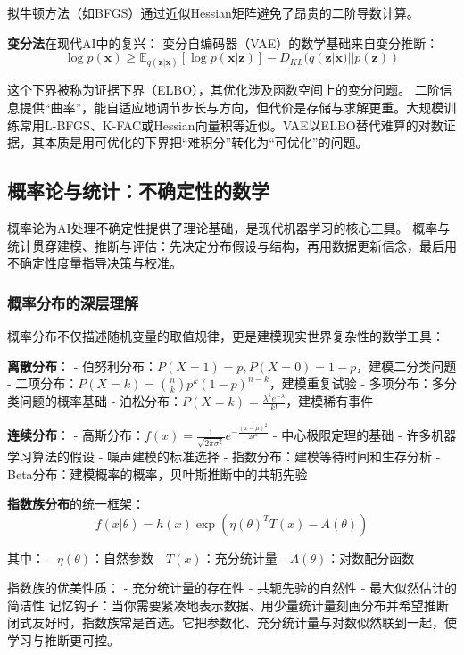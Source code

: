 拟牛顿方法（如BFGS）通过近似Hessian矩阵避免了昂贵的二阶导数计算。

\textbf{变分法}在现代AI中的复兴：
变分自编码器（VAE）的数学基础来自变分推断：
$$\log p(\mathbf{x}) \geq \mathbb{E}_{q(\mathbf{z}|\mathbf{x})}[\log p(\mathbf{x}|\mathbf{z})] - D_{KL}(q(\mathbf{z}|\mathbf{x})||p(\mathbf{z}))$$

这个下界被称为证据下界（ELBO），其优化涉及函数空间上的变分问题。
二阶信息提供“曲率”，能自适应地调节步长与方向，但代价是存储与求解更重。大规模训练常用L-BFGS、K-FAC或Hessian向量积等近似。VAE以ELBO替代难算的对数证据，其本质是用可优化的下界把“难积分”转化为“可优化”的问题。

\subsection{概率论与统计：不确定性的数学}

概率论为AI处理不确定性提供了理论基础，是现代机器学习的核心工具。
概率与统计贯穿建模、推断与评估：先决定分布假设与结构，再用数据更新信念，最后用不确定性度量指导决策与校准。

\subsubsection{概率分布的深层理解}

概率分布不仅描述随机变量的取值规律，更是建模现实世界复杂性的数学工具：

\textbf{离散分布}：
- 伯努利分布：$P(X=1) = p, P(X=0) = 1-p$，建模二分类问题
- 二项分布：$P(X=k) = \binom{n}{k}p^k(1-p)^{n-k}$，建模重复试验
- 多项分布：多分类问题的概率基础
- 泊松分布：$P(X=k) = \frac{\lambda^k e^{-\lambda}}{k!}$，建模稀有事件

\textbf{连续分布}：
- 高斯分布：$f(x) = \frac{1}{\sqrt{2\pi\sigma^2}}e^{-\frac{(x-\mu)^2}{2\sigma^2}}$
  - 中心极限定理的基础
  - 许多机器学习算法的假设
  - 噪声建模的标准选择
- 指数分布：建模等待时间和生存分析
- Beta分布：建模概率的概率，贝叶斯推断中的共轭先验

\textbf{指数族分布}的统一框架：
$$f(x|\theta) = h(x)\exp(\eta(\theta)^T T(x) - A(\theta))$$

其中：
- $\eta(\theta)$：自然参数
- $T(x)$：充分统计量
- $A(\theta)$：对数配分函数

指数族的优美性质：
- 充分统计量的存在性
- 共轭先验的自然性
- 最大似然估计的简洁性
记忆钩子：当你需要紧凑地表示数据、用少量统计量刻画分布并希望推断闭式友好时，指数族常是首选。它把参数化、充分统计量与对数似然联到一起，使学习与推断更可控。

